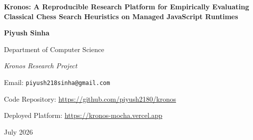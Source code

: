 \documentclass[11pt,titlepage,onecolumn]{report}
\begin{document}
\begin{titlepage}
    \centering
    \vspace*{2cm}
    {\huge \bfseries Kronos: A Reproducible Research Platform for Empirically Evaluating Classical Chess Search Heuristics on Managed JavaScript Runtimes \par}
    \vspace{2cm}
    {\Large \textbf{Piyush Sinha} \par}
    \vspace{1cm}
    {\large Department of Computer Science \par}
    \textit{Kronos Research Project} \par
    Email: \texttt{piyush218sinha@gmail.com} \par
    \vspace{0.5cm}
    Code Repository: \url{https://github.com/piyush2180/kronos} \par
    Deployed Platform: \url{https://kronos-mocha.vercel.app} \par
    \vspace{5.5cm}
    {\large July 2026 \par}
\end{titlepage}



\begin{abstract}

\end{abstract}

\clearpage



\clearpage

\tableofcontents
\clearpage
\listoffigures
\clearpage
\listoftables
\clearpage

\setcounter{page}{1}


\clearpage



\clearpage
\appendix

\end{document}

